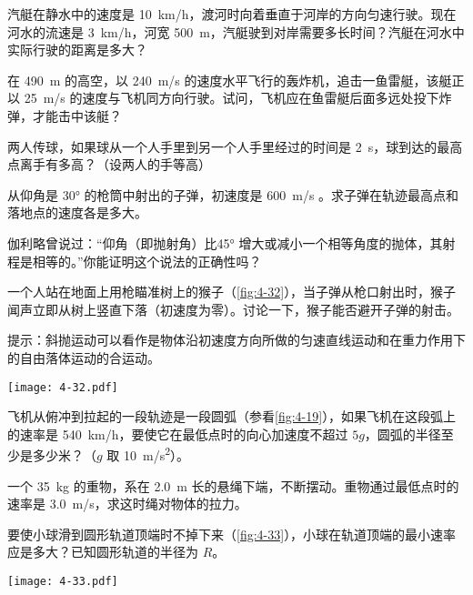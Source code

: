 \begin{Exercise}
\begin{question}
	\item 汽艇在静水中的速度是 \qty{10}{km/h}，渡河时向着垂直于河岸的方向匀速行驶。现在河水的流速是 \qty{3}{km/h}，河宽 \qty{500}{m}，汽艇驶到对岸需要多长时间？汽艇在河水中实际行驶的距离是多大？
  \item 在 \qty{490}{m} 的高空，以 \qty{240}{m/s} 的速度水平飞行的轰炸机，追击一鱼雷艇，该艇正以 \qty{25}{m/s} 的速度与飞机同方向行驶。试问，飞机应在鱼雷艇后面多远处投下炸弹，才能击中该艇？
  \item 两人传球，如果球从一个人手里到另一个人手里经过的时间是 \qty{2}{s}，球到达的最高点离手有多高？（设两人的手等高）
  \item 从仰角是 \ang{30} 的枪筒中射出的子弹，初速度是 \qty{600}{m/s} 。求子弹在轨迹最高点和落地点的速度各是多大。
  \item 伽利略曾说过：“仰角（即抛射角）比\ang{45} 增大或减小一个相等角度的抛体，其射程是相等的。”你能证明这个说法的正确性吗？
\item 一个人站在地面上用枪瞄准树上的猴子（\cref{fig:4-32}），当子弹从枪口射出时，猴子闻声立即从树上竖直下落（初速度为零）。讨论一下，猴子能否避开子弹的射击。

提示：斜抛运动可以看作是物体沿初速度方向所做的匀速直线运动和在重力作用下的自由落体运动的合运动。

\begin{figurehere}
  \texttt{[image: 4-32.pdf]}
  \label{fig:4-32}
\end{figurehere}

\item  飞机从俯冲到拉起的一段轨迹是一段圆弧（参看\cref{fig:4-19}），如果飞机在这段弧上的速率是 \qty{540}{km/h}，要使它在最低点时的向心加速度不超过 $5g$，圆弧的半径至少是多少米？（$g$ 取 \qty{10}{m/s^2}）。
\item  一个 \qty{35}{kg} 的重物，系在 \qty{2.0}{m} 长的悬绳下端，不断摆动。重物通过最低点时的速率是 \qty{3.0}{m/s}，求这时绳对物体的拉力。
\item  要使小球滑到圆形轨道顶端时不掉下来（\cref{fig:4-33}），小球在轨道顶端的最小速率应是多大？已知圆形轨道的半径为 $R$。
\begin{figurehere}
  \begin{minipage}{\linewidth}\centering
    \texttt{[image: 4-33.pdf]}
    \label{fig:4-33}
  \end{minipage}
\end{figurehere}


\end{question}
\end{Exercise}
